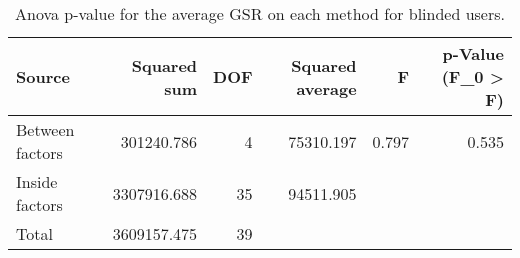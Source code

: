 
\begin{table}[!htb]
\centering
\caption{Anova p-value for the average GSR on each method for blinded users.}
\label{tab:anova_gsr}
\begin{tabular}{lrrrrr}
\toprule
         Source &  Squared sum &  DOF & Squared average &     F & p-Value (F\_0 > F) \\
\midrule
Between factors &   301240.786 &    4 &       75310.197 & 0.797 &             0.535 \\
 Inside factors &  3307916.688 &   35 &       94511.905 &       &                   \\
          Total &  3609157.475 &   39 &                 &       &                   \\
\bottomrule
\end{tabular}
\end{table}

